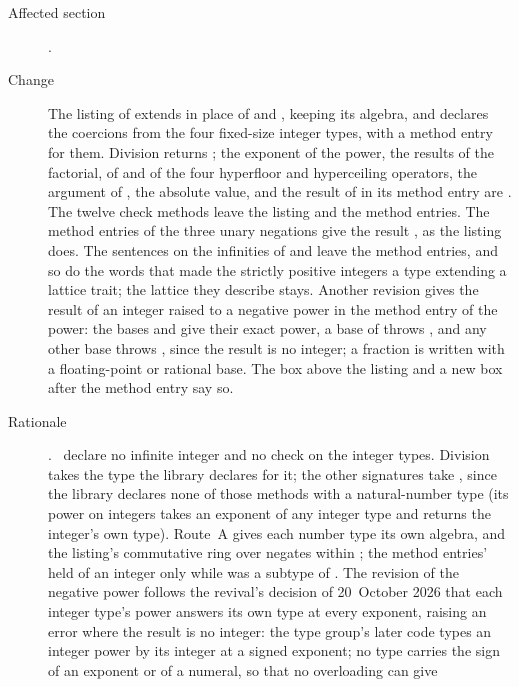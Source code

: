 \begin{description}
\item[Affected section] .
\item[Change] The listing of  extends  in place of
 and , keeping its algebra, and declares the
coercions from the four fixed-size integer types, with a method entry for them.
Division returns ; the exponent of the power, the results of the
factorial, of  and of the four hyperfloor and hyperceiling
operators, the argument of , the absolute value, and the result of
 in its method entry are .
The twelve check methods leave the listing and the method entries. The method entries of the three unary negations give the result , as the listing does.
The sentences on the infinities of  and 
leave the method entries, and so do the words that made the strictly positive
integers a type extending a lattice trait; the lattice they describe stays.
Another revision gives the result of an integer raised to a negative power in
the method entry of the power: the bases  and  give their exact
power, a base of  throws , and any other base throws
, since the result is no integer; a fraction is written
with a floating-point or rational base. The box above the listing and a new box
after the method entry say so.
\item[Rationale] .
\Library\ declare no infinite integer and no check on the integer types.
Division takes the type the library declares for it; the other signatures take
, since the library declares none of those methods with a
natural-number type (its power on integers takes an exponent of any integer
type and returns the integer's own type). Route~A gives each number type its own algebra, and the listing's commutative ring over  negates within ; the method entries'  held of an integer only while  was a subtype of .
The revision of the negative power follows the revival's decision of
20~October 2026 that each integer type's power answers its own type at every
exponent, raising an error where the result is no integer: the type group's
later code types an integer power by its integer at a signed exponent; no type
carries the sign of an exponent or of a numeral, so that no overloading can give

\end{description}
